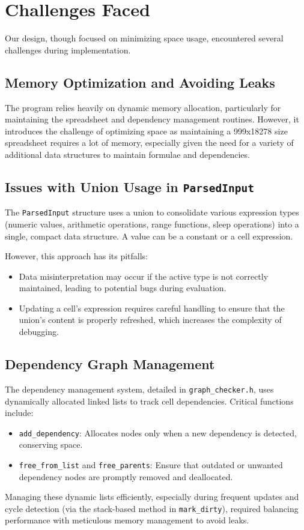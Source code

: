 \documentclass[12pt]{article}
\begin{document}
\section*{Challenges Faced}

Our design, though focused on minimizing space usage, encountered several challenges during implementation.

\subsection*{Memory Optimization and Avoiding Leaks}
The program relies heavily on dynamic memory allocation, particularly for maintaining the spreadsheet and dependency management routines. However, it introduces the challenge of optimizing space as maintaining a 999x18278 size spreadsheet requires a lot of memory, especially given the need for a variety of additional data structures to maintain formulae and dependencies.


\subsection*{Issues with Union Usage in \texttt{ParsedInput}}
The \texttt{ParsedInput} structure uses a union to consolidate various expression types (numeric values, arithmetic operations, range functions, sleep operations) into a single, compact data structure. A value can be a constant or a cell expression.

However, this approach has its pitfalls:
\begin{itemize}
    \item Data misinterpretation may occur if the active type is not correctly maintained, leading to potential bugs during evaluation.
    \item Updating a cell's expression requires careful handling to ensure that the union's content is properly refreshed, which increases the complexity of debugging.
\end{itemize}

\subsection*{Dependency Graph Management}
The dependency management system, detailed in \texttt{graph\_checker.h}, uses dynamically allocated linked lists to track cell dependencies. Critical functions include:
\begin{itemize}
    \item \texttt{add\_dependency}: Allocates nodes only when a new dependency is detected, conserving space.
    \item \texttt{free\_from\_list} and \texttt{free\_parents}: Ensure that outdated or unwanted dependency nodes are promptly removed and deallocated.
\end{itemize}
Managing these dynamic lists efficiently, especially during frequent updates and cycle detection (via the stack-based method in \texttt{mark\_dirty}), required balancing performance with meticulous memory management to avoid leaks.
\end{document}
